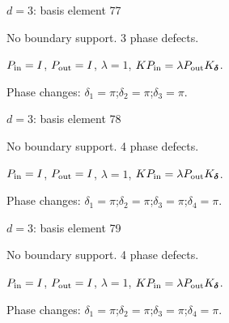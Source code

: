 \vfill
{\footnotesize\texttt{}}
\newpage
{}
{\Large $d=3$: basis element 77}\par
No boundary support. 3 phase defects.
\begin{center}
\end{center}
\vspace{-1mm}
$P_{\rm in}=I$, \quad $P_{\rm out}=I$, \quad $\lambda=1$, \qquad $K P_{\rm in}=\lambda P_{\rm out}K_{\boldsymbol\delta}$.
\par\smallskip\begin{minipage}{.98\linewidth}\small Phase changes: $\delta_{1}=\pi$;\quad $\delta_{2}=\pi$;\quad $\delta_{3}=\pi$.\end{minipage}
\vfill
{\footnotesize\texttt{}}
\newpage
{}
{\Large $d=3$: basis element 78}\par
No boundary support. 4 phase defects.
\begin{center}
\end{center}
\vspace{-1mm}
$P_{\rm in}=I$, \quad $P_{\rm out}=I$, \quad $\lambda=1$, \qquad $K P_{\rm in}=\lambda P_{\rm out}K_{\boldsymbol\delta}$.
\par\smallskip\begin{minipage}{.98\linewidth}\small Phase changes: $\delta_{1}=\pi$;\quad $\delta_{2}=\pi$;\quad $\delta_{3}=\pi$;\quad $\delta_{4}=\pi$.\end{minipage}
\vfill
{\footnotesize\texttt{}}
\newpage
{}
{\Large $d=3$: basis element 79}\par
No boundary support. 4 phase defects.
\begin{center}
\end{center}
\vspace{-1mm}
$P_{\rm in}=I$, \quad $P_{\rm out}=I$, \quad $\lambda=1$, \qquad $K P_{\rm in}=\lambda P_{\rm out}K_{\boldsymbol\delta}$.
\par\smallskip\begin{minipage}{.98\linewidth}\small Phase changes: $\delta_{1}=\pi$;\quad $\delta_{2}=\pi$;\quad $\delta_{3}=\pi$;\quad $\delta_{4}=\pi$.\end{minipage}
\vfill
{\footnotesize\texttt{}}
